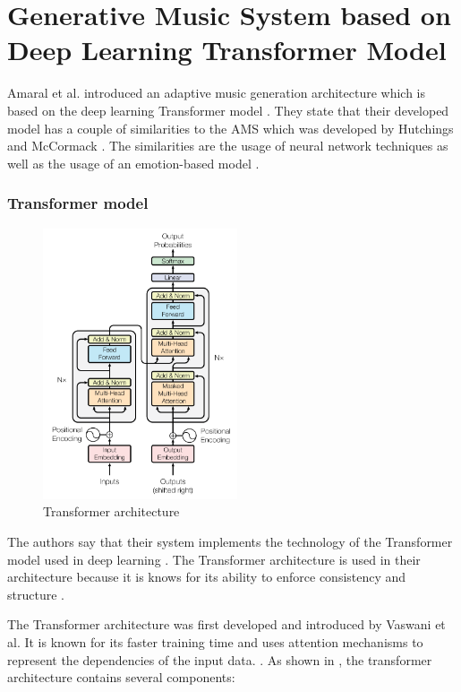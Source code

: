 \section{Generative Music System based on Deep Learning Transformer Model}

Amaral et al. introduced an adaptive music generation
architecture which is based on the deep learning 
Transformer model \cite{amaral2022adaptive}.
They state that their developed model has a couple of similarities
to the AMS \cite{hutMcCormAms} which was developed by Hutchings and 
McCormack \cite{amaral2022adaptive}. The similarities are the usage of
neural network techniques as well as the usage of an emotion-based model \cite{amaral2022adaptive}. 

\subsubsection{Transformer model}

\begin{figure}[h]
    \centering
    \includegraphics[height=8cm]{images/transformer_architecture.png}
    \caption{Transformer architecture \cite{vaswani2017transformer}}
    \label{fig:transformer_architecture}
\end{figure}

The authors say that their system implements the technology of the 
Transformer model used in deep learning \cite{amaral2022adaptive}. 
The Transformer architecture \cite{vaswani2017transformer} is used in 
their architecture because it is knows for its ability to enforce consistency and structure \cite{amaral2022adaptive}.

The Transformer architecture was first developed and introduced by 
Vaswani et al. It is known for its faster training time and uses attention mechanisms
to represent the dependencies of the input data. \cite{vaswani2017transformer}. 
As shown in , the
transformer architecture contains several components:

